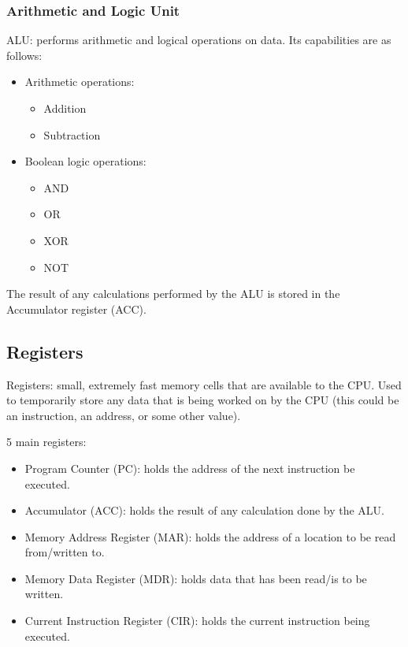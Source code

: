 \documentclass[a4paper]{report}
\begin{document}
\subsubsection{Arithmetic and Logic Unit}

ALU: performs arithmetic and logical operations on data. Its capabilities are
as follows:

\begin{itemize}
	\item{Arithmetic operations:}
		\begin{itemize}
			\item{Addition}
			\item{Subtraction}
		\end{itemize}
	\item{Boolean logic operations:}
		\begin{itemize}
			\item{AND}
			\item{OR}
			\item{XOR}
			\item{NOT}
		\end{itemize}
\end{itemize}

The result of any calculations performed by the ALU is stored in the
Accumulator register (ACC).

\subsection{Registers}

Registers: small, extremely fast memory cells that are available to the CPU.
Used to temporarily store any data that is being worked on by the CPU (this
could be an instruction, an address, or some other value).

5 main registers:

\begin{itemize}
	\item{Program Counter (PC): holds the address of the next instruction
		be executed.}
	\item{Accumulator (ACC): holds the result of any calculation done by
		the ALU.}
	\item{Memory Address Register (MAR): holds the address of a location
		to be read from/written to.}
	\item{Memory Data Register (MDR): holds data that has been read/is to
		be written.}
	\item{Current Instruction Register (CIR): holds the current
		instruction being executed.}
\end{itemize}
\end{document}
